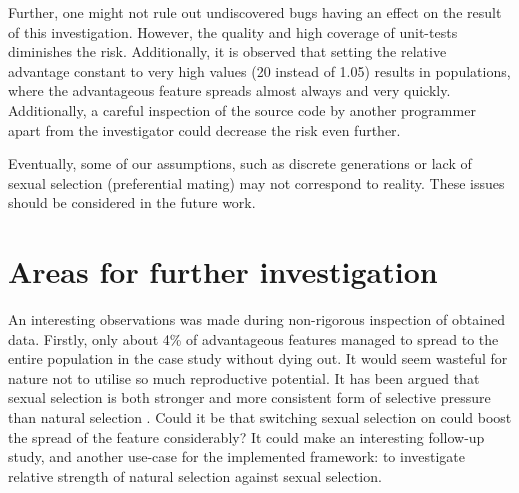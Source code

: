 \documentclass{l4proj}
\begin{document}
Further, one might not rule out undiscovered bugs having an effect on the result of this investigation. However, the quality and high coverage of unit-tests diminishes the risk. Additionally, it is observed that setting the relative advantage constant to very high values (20 instead of 1.05) results in populations, where the advantageous feature spreads almost always and very quickly. Additionally, a careful inspection of the source code by another programmer apart from the investigator could decrease the risk even further.

Eventually, some of our assumptions, such as discrete generations or lack of sexual selection (preferential mating) may not correspond to reality. These issues should be considered in the future work.

\section{Areas for further investigation}

\begin{samepage}

An interesting observations was made during non-rigorous inspection of obtained data. Firstly, only about 4\% of advantageous features managed to spread to the entire population in the case study without dying out. It would seem wasteful for nature not to utilise so much reproductive potential. It has been argued that sexual selection is both stronger and more consistent form of selective pressure than natural selection \parencite{Miller14}. Could it be that switching sexual selection on could boost the spread of the feature considerably? It could make an interesting follow-up study, and another use-case for the implemented framework: to investigate relative strength of natural selection against sexual selection.

\end{samepage}

\printglossaries


\begingroup
\sloppy
\printbibliography[heading=bibintoc]
\endgroup

\end{document}

